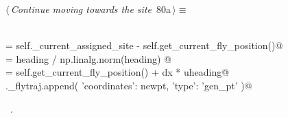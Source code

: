 \documentclass[11.5pt]{report}
\begin{document}
\vspace{-0.8cm} \newchunk {}
\begin{flushleft} \small
\begin{minipage}{\linewidth}\label{scrap123}\raggedright\small
{} $\langle\,${\itshape Continue moving towards the site}\nobreak\ {\footnotesize {80a}}$\,\rangle\equiv$
\vspace{-1ex}
\begin{list}{}{} \item
\mbox{}\verb@@\\
\mbox{}\verb@heading  = self._current_assigned_site - self.get_current_fly_position()@\\
\mbox{}\verb@uheading = heading / np.linalg.norm(heading) @\\
\mbox{}\verb@newpt    = self.get_current_fly_position() + dx * uheading@\\
\mbox{}\verb@self._flytraj.append(  {'coordinates': newpt, 'type': 'gen_pt'}  )@\\
\mbox{}\verb@@{\NWsep}
\end{list}
\vspace{-1.5ex}
\footnotesize
\begin{list}{}{\setlength{\itemsep}{-\parsep}\setlength{\itemindent}{-\leftmargin}}
\item \NWtxtMacroRefIn\ .

\item{}
\end{list}
\end{minipage}\vspace{4ex}
\end{flushleft}
\end{document}
